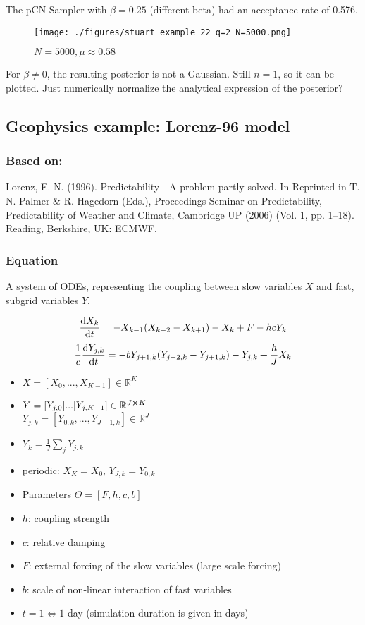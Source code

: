 \documentclass[11pt]{article}
\newcommand{\R}{{\mathbb{R}}}
\begin{document}
The pCN-Sampler with \(\beta = 0.25\) (different beta) had an acceptance rate of 0.576.

\begin{figure}[htbp]
\centering
\texttt{[image: ./figures/stuart\_example\_22\_q=2\_N=5000.png]}
\caption{\label{fig:stuart_22_density}
\(N=5000, \mu \approx 0.58\)}
\end{figure}

For \(\beta \neq 0\), the resulting posterior is not a Gaussian. Still \(n=1\), so it can be
plotted. Just numerically normalize the analytical expression of the posterior?
\subsection{Geophysics example: Lorenz-96 model}
\label{sec:org2efb943}

\subsubsection{Based on:}
\label{sec:org4bcae6d}

Lorenz, E. N. (1996). Predictability—A problem partly solved. In Reprinted in T. N. Palmer \& R. Hagedorn (Eds.), Proceedings Seminar on
Predictability, Predictability of Weather and Climate, Cambridge UP (2006) (Vol. 1, pp. 1–18). Reading, Berkshire, UK: ECMWF.

\subsubsection{Equation}
\label{sec:org8448dd5}

A system of ODEs, representing the coupling between slow variables \(X\) and fast, subgrid
variables \(Y\).

$$ \dv{X_k}{t} =                 - X_{k-1}(X_{k-2} - X_{k+1}) - X_k + F - hc \bar{Y}_k $$
$$ \frac{1}{c} \dv{Y_{j,k}}{t} = -bY_{j+1,k}(Y_{j-2,k} - Y_{j+1, k}) - Y_{j,k} + \frac{h}{J}X_k$$

\begin{itemize}
\item \(X = [X_0, ..., X_{K-1}] \in \R^K\)
\item \(Y = [Y_{j, 0} | ... | Y_{j, K-1}] \in \R^{J \cross K}\) \\
\(Y_{j,k} = [Y_{0,k}, ..., Y_{J-1,k}] \in  \R^J\)
\item \(\bar{Y}_k = \frac{1}{J}\sum_j Y_{j,k}\)
\item periodic: \(X_K = X_0\), \(Y_{J,k} = Y_{0,k}\)
\item Parameters \(\Theta = [F, h, c, b]\)
\item \(h\): coupling strength
\item \(c\): relative damping
\item \(F\): external forcing of the slow variables (large scale forcing)
\item \(b\): scale of non-linear interaction of fast variables
\item \(t = 1 \Leftrightarrow 1\) day (simulation duration is given in days)
\end{itemize}
\end{document}
